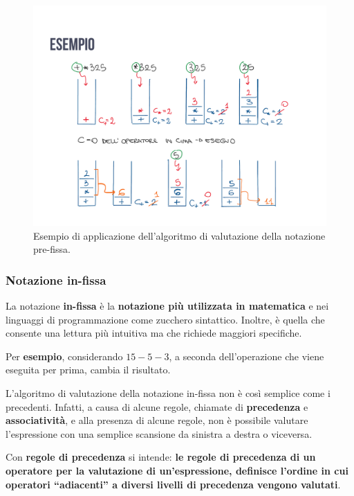 \documentclass[a4paper]{article}
\newcommand{\dquotes}[1]{``#1''}
\begin{document}
	\begin{figure}[!htp]
		\centering
		\includegraphics[width=\textwidth]{img/esempio_notazione_pre-fissa.pdf}
		\caption{Esempio di applicazione dell'algoritmo di valutazione della notazione pre-fissa.}
	\end{figure}\newpage
	
	\subsubsection{Notazione in-fissa}\label{notazione in-fissa}
	
	La notazione \textcolor{Red3}{\textbf{in-fissa}} è la \textbf{notazione più utilizzata in matematica} e nei linguaggi di programmazione come zucchero sintattico. Inoltre, è quella che consente una lettura più intuitiva ma che richiede maggiori specifiche.\newline
	
	\noindent
	Per \textcolor{Green4}{\textbf{esempio}}, considerando $15-5-3$, a seconda dell'operazione che viene eseguita per prima, cambia il risultato.\newline
	
	\noindent
	L'algoritmo di valutazione della notazione in-fissa non è così semplice come i precedenti. Infatti, a causa di alcune regole, chiamate di \textbf{precedenza} e \textbf{associatività}, e alla presenza di alcune regole, non è possibile valutare l'espressione con una semplice scansione da sinistra a destra o viceversa.\newline
	
	\noindent
	\begin{boxdef}
		Con \textcolor{Red3}{\textbf{regole di precedenza}} si intende: \textbf{le regole di precedenza di un operatore per la valutazione di un'espressione, definisce l'ordine in cui operatori \dquotes{adiacenti} a diversi livelli di precedenza vengono valutati}.
	\end{boxdef}
\end{document}
